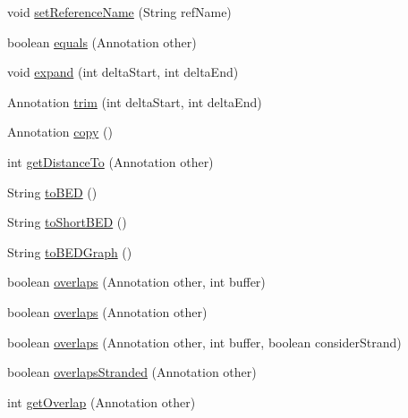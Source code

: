 \begin{DoxyCompactItemize}
\item 
void \hyperlink{classbroad_1_1core_1_1sequence_1_1_sequence_region_a8410b134db880c2c1ed53d392a28995b}{set\+Reference\+Name} (String ref\+Name)
\item 
boolean \hyperlink{classbroad_1_1core_1_1sequence_1_1_sequence_region_a3b4b4090bf360547986dfd12d2886638}{equals} (Annotation other)
\item 
void \hyperlink{classbroad_1_1core_1_1sequence_1_1_sequence_region_a57dd1a0001649bd7cca9943dd5536f74}{expand} (int delta\+Start, int delta\+End)
\item 
Annotation \hyperlink{classbroad_1_1core_1_1sequence_1_1_sequence_region_a1f607c93eda22d55576466c4f99dc1c0}{trim} (int delta\+Start, int delta\+End)
\item 
Annotation \hyperlink{classbroad_1_1core_1_1sequence_1_1_sequence_region_aa04f060027d77f46a1384c279bacacaa}{copy} ()
\item 
int \hyperlink{classbroad_1_1core_1_1sequence_1_1_sequence_region_afdd1bab8d2eaa788750036801d0c9456}{get\+Distance\+To} (Annotation other)
\item 
String \hyperlink{classbroad_1_1core_1_1sequence_1_1_sequence_region_a19014001166f5e017a11568a597c57dc}{to\+B\+E\+D} ()
\item 
String \hyperlink{classbroad_1_1core_1_1sequence_1_1_sequence_region_a932bc51abc67c5ce066ac0c936c082b4}{to\+Short\+B\+E\+D} ()
\item 
String \hyperlink{classbroad_1_1core_1_1sequence_1_1_sequence_region_a865eb80ba548a98f23a81e822be743a6}{to\+B\+E\+D\+Graph} ()
\item 
boolean \hyperlink{classbroad_1_1core_1_1sequence_1_1_sequence_region_aea7118c7f1330d6c88bd7b045ee5df2f}{overlaps} (Annotation other, int buffer)
\item 
boolean \hyperlink{classbroad_1_1core_1_1sequence_1_1_sequence_region_ac03343782fa873a397b6cedea9d0956e}{overlaps} (Annotation other)
\item 
boolean \hyperlink{classbroad_1_1core_1_1sequence_1_1_sequence_region_a7054ec626e752e31a182a4f34e04170c}{overlaps} (Annotation other, int buffer, boolean consider\+Strand)
\item 
boolean \hyperlink{classbroad_1_1core_1_1sequence_1_1_sequence_region_a48b8785a7065ca4786747829dbf22b62}{overlaps\+Stranded} (Annotation other)
\item 
int \hyperlink{classbroad_1_1core_1_1sequence_1_1_sequence_region_a295275afcd925eba445d7183436c5265}{get\+Overlap} (Annotation other)
\item 

\end{DoxyCompactItemize}
